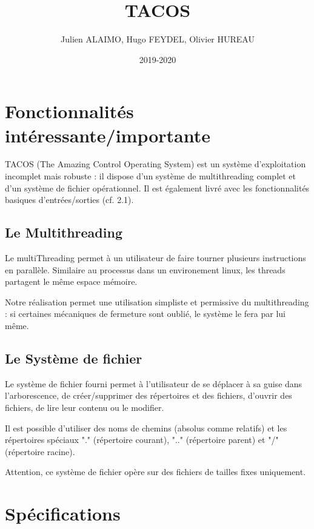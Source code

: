 \documentclass{article}
\title{TACOS}
\author{Julien ALAIMO, Hugo FEYDEL, Olivier HUREAU }
\date{2019-2020}
\begin{document}
\maketitle

\section{Fonctionnalités intéressante/importante}

TACOS (The Amazing Control Operating System) est un système d'exploitation incomplet mais robuste : il dispose d'un système de multithreading complet et d'un système de fichier opérationnel. Il est également livré avec les fonctionnalités basiques d'entrées/sorties (cf. 2.1).

\subsection{Le Multithreading}

Le multiThreading permet à un utilisateur de faire tourner plusieurs instructions en parallèle. Similaire au processus dans un environement linux, les threads partagent le même espace mémoire.

Notre réalisation permet une utilisation simpliste et permissive du multithreading : si certaines mécaniques de fermeture sont oublié, le système le fera par lui même. 

\subsection{Le Système de fichier}

Le système de fichier fourni permet à l'utilisateur de se déplacer à sa guise dans l'arborescence, de créer/supprimer des répertoires et des fichiers, d'ouvrir des fichiers, de lire leur contenu ou le modifier.

Il est possible d'utiliser des noms de chemins (absolus comme relatifs) et les répertoires spéciaux "." (répertoire courant), ".." (répertoire parent) et "/" (répertoire racine).

Attention, ce système de fichier opère sur des fichiers de tailles fixes uniquement.

\newpage

\section{Spécifications}
\end{document}
